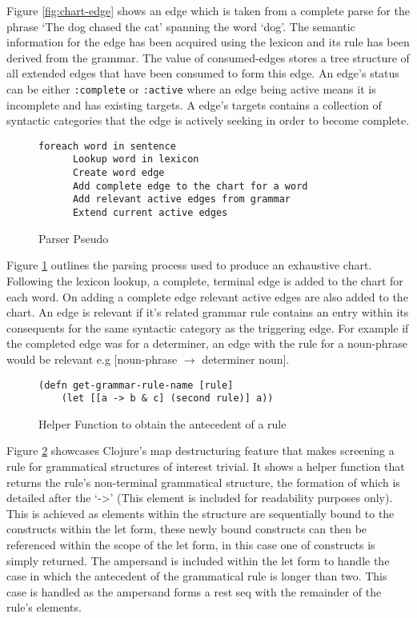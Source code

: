 \documentclass[11pt, a4paper]{article}
\begin{document}
Figure \ref{fig:chart-edge} shows an edge which is taken from a complete parse for the phrase `The dog chased the cat' spanning the word `dog'. The semantic information for the edge has been acquired using the lexicon and its rule has been derived from the grammar. The value of consumed-edges stores a tree structure of all extended edges that have been consumed to form this edge. An edge's status can be either \texttt{:complete} or \texttt{:active} where an edge being active means it is incomplete and has existing targets. A edge's targets contains a collection of syntactic categories that the edge is actively seeking in order to become complete.


\begin{figure}[H]
\begin{Verbatim}[frame=leftline]
  foreach word in sentence 
	  Lookup word in lexicon
	  Create word edge
	  Add complete edge to the chart for a word
	  Add relevant active edges from grammar 
	  Extend current active edges
\end{Verbatim}
\caption{Parser Pseudo}
\label{fig:parser-pseudo}
\end{figure}

\noindent

Figure \ref{fig:parser-pseudo} outlines the parsing process used to produce an exhaustive chart. Following the lexicon lookup, a complete, terminal edge is added to the chart for each word. On adding a complete edge relevant active edges are also added to the chart. An edge is relevant if it's related grammar rule contains an entry within its consequents for the same syntactic category as the triggering edge. For example if the completed edge was for a determiner, an edge with the rule for a noun-phrase would be relevant e.g $[$noun-phrase $\longrightarrow$ determiner noun$]$.


\begin{figure}[H]
	\begin{Verbatim}[frame=leftline]
  (defn get-grammar-rule-name [rule]
    (let [[a -> b & c] (second rule)] a))
	\end{Verbatim}
	\caption{Helper Function to obtain the antecedent of a rule}
	\label{fig:helper-func}
\end{figure}

Figure \ref{fig:helper-func} showcases Clojure's map destructuring feature that makes screening a rule for grammatical structures of interest trivial. It shows a helper function that returns the rule's non-terminal grammatical structure, the formation of which is detailed after the `->' (This element is included for readability purposes only). This is achieved as elements within the structure are sequentially bound to the constructs within the let form, these newly bound constructs can then be referenced within the scope of the let form, in this case one of constructs is simply returned. The ampersand is included within the let form to handle the case in which the antecedent of the grammatical rule is longer than two. This case is handled as the ampersand forms a rest seq with the remainder of the rule's elements. 
\end{document}
